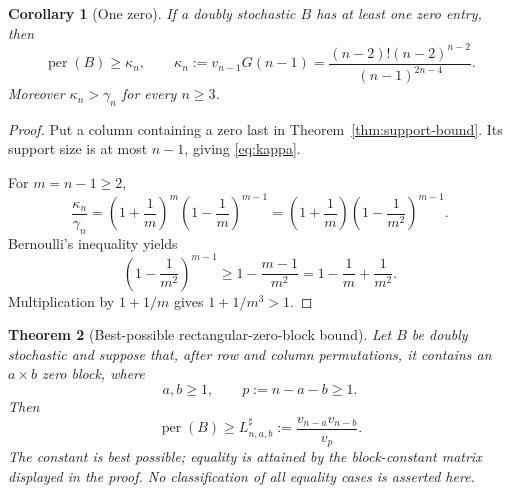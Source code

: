 \documentclass[11pt,a4paper]{article}
\numberwithin{equation}{section}
\newtheorem{theorem}{Theorem}[section]
\newtheorem{corollary}[theorem]{Corollary}
\theoremstyle{definition}
\newcommand{\per}{\operatorname{per}}
\newcommand{\1}{\mathbf{1}}
\begin{document}
\begin{corollary}[One zero]\label{cor:one-zero}
If a doubly stochastic $B$ has at least one zero entry, then
\begin{equation}\label{eq:kappa}
 \per(B)\ge\kappa_n,
 \qquad
 \kappa_n:=v_{n-1}G(n-1)
 =\frac{(n-2)!(n-2)^{n-2}}{(n-1)^{2n-4}}.
\end{equation}
Moreover $\kappa_n>\gamma_n$ for every $n\ge3$.
\end{corollary}

\begin{proof}
Put a column containing a zero last in Theorem~\ref{thm:support-bound}.  Its support size is at most $n-1$, giving \eqref{eq:kappa}.

For $m=n-1\ge2$,
\[
 \frac{\kappa_n}{\gamma_n}
 =\left(1+\frac1m\right)^m
  \left(1-\frac1m\right)^{m-1}
 =\left(1+\frac1m\right)
  \left(1-\frac1{m^2}\right)^{m-1}.
\]
Bernoulli's inequality yields
\[
 \left(1-\frac1{m^2}\right)^{m-1}
 \ge1-\frac{m-1}{m^2}
 =1-\frac1m+\frac1{m^2}.
\]
Multiplication by $1+1/m$ gives $1+1/m^3>1$.
\end{proof}

\begin{theorem}[Best-possible rectangular-zero-block bound]\label{thm:rectangular}
Let $B$ be doubly stochastic and suppose that, after row and column permutations, it contains an $a\times b$ zero block, where
\[
 a,b\ge1,
 \qquad
 p:=n-a-b\ge1.
\]
Then
\begin{equation}\label{eq:sharp-block}
 \per(B)\ge
 L^{\sharp}_{n,a,b}:=
 \frac{v_{n-a}v_{n-b}}{v_p}.
\end{equation}
The constant is best possible; equality is attained by the block-constant
matrix displayed in the proof.  No classification of all equality cases is
asserted here.
\end{theorem}
\end{document}
